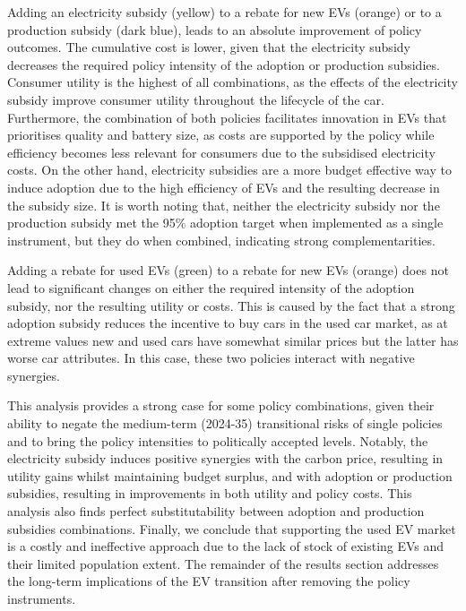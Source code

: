 \documentclass[12pt]{article}
\begin{document}
    Adding an electricity subsidy (yellow) to a rebate for new EVs (orange) or to a production subsidy (dark blue), leads to an absolute improvement of policy outcomes. The cumulative cost is lower, given that the electricity subsidy decreases the required policy intensity of the adoption or production subsidies. Consumer utility is the highest of all combinations, as the effects of the electricity subsidy improve consumer utility throughout the lifecycle of the car. Furthermore, the combination of both policies facilitates innovation in EVs that prioritises quality and battery size, as costs are supported by the policy while efficiency becomes less relevant for consumers due to the subsidised electricity costs. On the other hand, electricity subsidies are a more budget effective way to induce adoption due to the high efficiency of EVs and the resulting decrease in the subsidy size. It is worth noting that, neither the electricity subsidy nor the production subsidy met the 95\% adoption target when implemented as a single instrument, but they do when combined, indicating strong complementarities.

    Adding a rebate for used EVs (green) to a rebate for new EVs (orange) does not lead to significant changes on either the required intensity of the adoption subsidy, nor the resulting utility or costs. This is caused by the fact that a strong adoption subsidy reduces the incentive to buy cars in the used car market, as at extreme values new and used cars have somewhat similar prices but the latter has worse car attributes. In this case, these two policies interact with negative synergies.







    This analysis provides a strong case for some policy combinations, given their ability to negate the medium-term (2024-35) transitional risks of single policies and to bring the policy intensities to politically accepted levels. Notably, the electricity subsidy induces positive synergies with the carbon price, resulting in utility gains whilst maintaining budget surplus, and with adoption or production subsidies, resulting in improvements in both utility and policy costs. This analysis also finds perfect substitutability between adoption and production subsidies combinations. Finally, we conclude that supporting the used EV market is a costly and ineffective approach due to the lack of stock of existing EVs and their limited population extent.
    The remainder of the results section addresses the long-term implications of the EV transition after removing the policy instruments.
\end{document}
